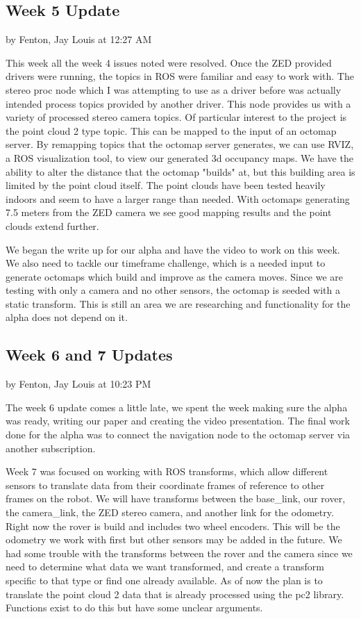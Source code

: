 \documentclass[10pt, oneside,onecolumn]{IEEEtran}
\begin{document}
\begin{titlepage}
\subsection{Week 5 Update}
by Fenton, Jay Louis at 12:27 AM

This week all the week 4 issues noted were resolved. Once the ZED provided drivers were running, the topics in ROS were familiar and easy to work with. The stereo proc node which I was attempting to use as a driver before was actually intended process topics provided by another driver. This node provides us with a variety of processed stereo camera topics. Of particular interest to the project is the point cloud 2 type topic. This can be mapped to the input of an octomap server. By remapping topics that the octomap server generates, we can use RVIZ, a ROS visualization tool, to view our generated 3d occupancy maps. We have the ability to alter the distance that the octomap "builds" at, but this building area is limited by the point cloud itself. The point clouds have been tested heavily indoors and seem to have a larger range than needed. With octomaps generating 7.5 meters from the ZED camera we see good mapping results and the point clouds extend further. 

We began the write up for our alpha and have the video to work on this week. We also need to tackle our timeframe challenge, which is a needed input to generate octomaps which build and improve as the camera moves. Since we are testing with only a camera and no other sensors, the octomap is seeded with a static transform. This is still an area we are researching and functionality for the alpha does not depend on it. 

\subsection{Week 6 and 7 Updates}
by Fenton, Jay Louis at 10:23 PM

The week 6 update comes a little late, we spent the week making sure the alpha was ready, writing our paper and creating the video presentation. The final work done for the alpha was to connect the navigation node to the octomap server via another subscription. 

Week 7 was focused on working with ROS transforms, which allow different sensors to translate data from their coordinate frames of reference to other frames on the robot. We will have transforms between the base\_link, our rover, the camera\_link, the ZED stereo camera, and another link for the odometry. Right now the rover is build and includes two wheel encoders. This will be the odometry we work with first but other sensors may be added in the future. We had some trouble with the transforms between the rover and the camera since we need to determine what data we want transformed, and create a transform specific to that type or find one already available. As of now the plan is to translate the point cloud 2 data that is already processed using the pc2 library. Functions exist to do this but have some unclear arguments. 


\end{titlepage}
\end{document}

